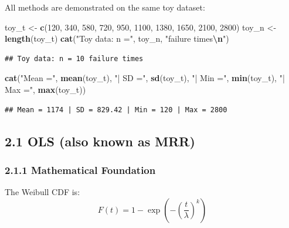 \documentclass[
]{article}
\newenvironment{Shaded}{\begin{snugshade}}{\end{snugshade}}
\newcommand{\DecValTok}[1]{\textcolor[rgb]{0.00,0.00,0.81}{#1}}
\newcommand{\FunctionTok}[1]{\textcolor[rgb]{0.13,0.29,0.53}{\textbf{#1}}}
\newcommand{\NormalTok}[1]{#1}
\newcommand{\OtherTok}[1]{\textcolor[rgb]{0.56,0.35,0.01}{#1}}
\newcommand{\SpecialCharTok}[1]{\textcolor[rgb]{0.81,0.36,0.00}{\textbf{#1}}}
\newcommand{\StringTok}[1]{\textcolor[rgb]{0.31,0.60,0.02}{#1}}
\begin{document}
All methods are demonstrated on the same toy dataset:

\begin{Shaded}
\begin{Highlighting}[]
\NormalTok{toy\_t }\OtherTok{\textless{}{-}} \FunctionTok{c}\NormalTok{(}\DecValTok{120}\NormalTok{, }\DecValTok{340}\NormalTok{, }\DecValTok{580}\NormalTok{, }\DecValTok{720}\NormalTok{, }\DecValTok{950}\NormalTok{, }\DecValTok{1100}\NormalTok{, }\DecValTok{1380}\NormalTok{, }\DecValTok{1650}\NormalTok{, }\DecValTok{2100}\NormalTok{, }\DecValTok{2800}\NormalTok{)}
\NormalTok{toy\_n }\OtherTok{\textless{}{-}} \FunctionTok{length}\NormalTok{(toy\_t)}
\FunctionTok{cat}\NormalTok{(}\StringTok{"Toy data: n ="}\NormalTok{, toy\_n, }\StringTok{"failure times}\SpecialCharTok{\textbackslash{}n}\StringTok{"}\NormalTok{)}
\end{Highlighting}
\end{Shaded}

\begin{verbatim}
## Toy data: n = 10 failure times
\end{verbatim}

\begin{Shaded}
\begin{Highlighting}[]
\FunctionTok{cat}\NormalTok{(}\StringTok{"Mean ="}\NormalTok{, }\FunctionTok{mean}\NormalTok{(toy\_t), }\StringTok{"| SD ="}\NormalTok{, }\FunctionTok{sd}\NormalTok{(toy\_t), }\StringTok{"| Min ="}\NormalTok{, }\FunctionTok{min}\NormalTok{(toy\_t), }\StringTok{"| Max ="}\NormalTok{, }\FunctionTok{max}\NormalTok{(toy\_t))}
\end{Highlighting}
\end{Shaded}

\begin{verbatim}
## Mean = 1174 | SD = 829.42 | Min = 120 | Max = 2800
\end{verbatim}

\subsection{2.1 OLS (also known as MRR)}\label{ols-also-known-as-mrr}

\subsubsection{2.1.1 Mathematical
Foundation}\label{mathematical-foundation}

The Weibull CDF is:
\[F(t) = 1 - \exp\left(-\left(\frac{t}{\lambda}\right)^k\right)\]
\end{document}
